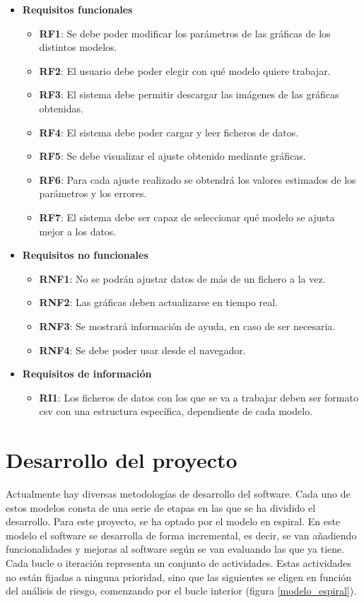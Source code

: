 \begin{itemize}
\item \textbf{Requisitos funcionales}
	\begin{itemize}
	\item \textbf{RF1}: Se debe poder modificar los parámetros de las gráficas de los distintos modelos.
	\item \textbf{RF2}: El usuario debe poder elegir con qué modelo quiere trabajar.
	\item \textbf{RF3}: El sistema debe permitir descargar las imágenes de las gráficas obtenidas.
	\item \textbf{RF4}: El sistema debe poder cargar y leer ficheros de datos.
	\item \textbf{RF5}: Se debe visualizar el ajuste obtenido mediante gráficas.
	\item \textbf{RF6}: Para cada ajuste realizado se obtendrá los valores estimados de los parámetros y los errores.
	\item \textbf{RF7}: El sistema debe ser capaz de seleccionar qué modelo se ajusta mejor a los datos. 
	\end{itemize}
\item \textbf{Requisitos no funcionales}
	\begin{itemize}
	\item \textbf{RNF1}: No se podrán ajustar datos de más de un fichero a la vez.
	\item \textbf{RNF2}: Las gráficas deben actualizarse en tiempo real.
	\item \textbf{RNF3}: Se mostrará información de ayuda, en caso de ser necesaria.
	\item \textbf{RNF4}: Se debe poder usar desde el navegador.
	\end{itemize}
\item \textbf{Requisitos de información}
	\begin{itemize}
	\item \textbf{RI1}: Los ficheros de datos con los que se va a trabajar deben ser formato csv con una estructura específica, dependiente de cada modelo.
	\end{itemize}
\end{itemize}

\section{Desarrollo del proyecto}

Actualmente hay diversas metodologías de desarrollo del software. Cada uno de estos modelos consta de una serie de etapas en las que se ha dividido el desarrollo. Para este proyecto, se ha optado por el modelo en espiral. En este modelo el software se desarrolla de forma incremental, es decir, se van añadiendo funcionalidades y mejoras al software según se van evaluando las que ya tiene. Cada bucle o iteración representa un conjunto de actividades. Estas actividades no están fijadas a ninguna prioridad, sino que las siguientes se eligen en función del análisis de riesgo, comenzando por el bucle interior (figura \eqref{modelo_espiral}).

